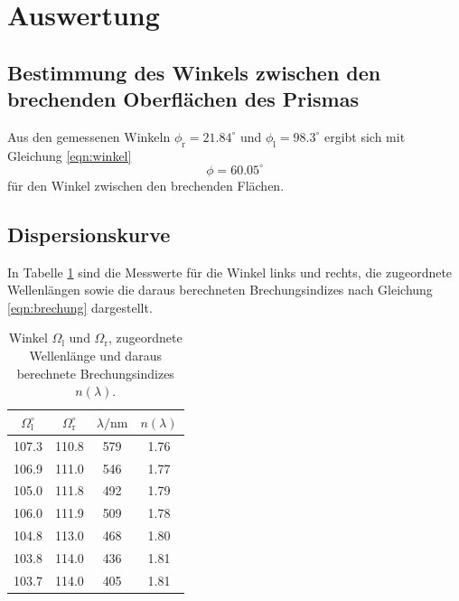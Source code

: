 \section{Auswertung}
\label{sec:Auswertung}
\subsection{Bestimmung des Winkels zwischen den brechenden Oberflächen des Prismas}
Aus den gemessenen Winkeln $\phi_\mathrm{r}=21.84^\circ$ und $\phi_\mathrm{l}=98.3^\circ$ ergibt sich mit Gleichung \ref{eqn:winkel}
\begin{equation}
  \phi=60.05^\circ
\end{equation}
für den Winkel zwischen den brechenden Flächen.

\subsection{Dispersionskurve}

In Tabelle \ref{tab:messwerte} sind die Messwerte für die Winkel links und rechts, die zugeordnete Wellenlängen sowie die daraus berechneten Brechungsindizes nach Gleichung \ref{eqn:brechung} dargestellt.

\begin{table}
  \caption{Winkel $\Omega_\mathrm{l}$ und $\Omega_\mathrm{r}$, zugeordnete Wellenlänge und daraus berechnete Brechungsindizes $n(\lambda)$.}
  \centering
  \label{tab:messwerte}
  \begin{tabular}{c c c c}
  \toprule
   $\Omega_\mathrm{l}^\circ$ & $\Omega_\mathrm{r}^\circ$ & $\lambda/\si{\nano\meter}$ & $n(\lambda)$\\
 \midrule
107.3 & 110.8 & 579 & 1.76 \\
106.9 & 111.0 & 546 & 1.77 \\
105.0 & 111.8 & 492 & 1.79 \\
106.0 & 111.9 & 509 & 1.78 \\
104.8 & 113.0 & 468 & 1.80 \\
103.8 & 114.0 & 436 & 1.81 \\
103.7 & 114.0 & 405 & 1.81 \\
\bottomrule
\end{tabular}
\end{table}

